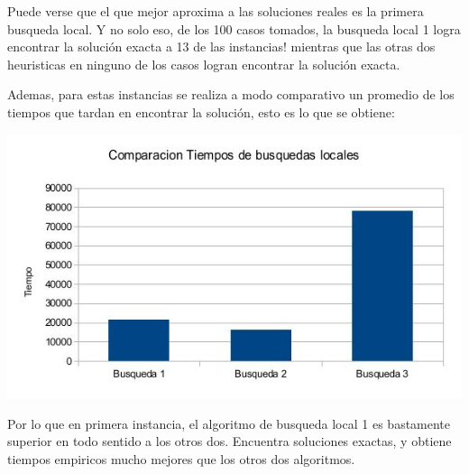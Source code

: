Puede verse que el que mejor aproxima a las soluciones reales es la primera busqueda local. Y no solo eso, de los 100 casos tomados, la busqueda local 1 logra encontrar la solución exacta a 13 de las instancias! mientras que las otras dos heuristicas en ninguno de los casos logran encontrar la solución exacta.

Ademas, para estas instancias se realiza a modo comparativo un promedio de los tiempos que tardan en encontrar la solución, esto es lo que se obtiene:

\includegraphics[scale=0.5]{Ej4/tiempotodos.jpg}

Por lo que en primera instancia, el algoritmo de busqueda local 1 es bastamente superior en todo sentido a los otros dos. Encuentra soluciones exactas, y obtiene tiempos empiricos mucho mejores que los otros dos algoritmos.